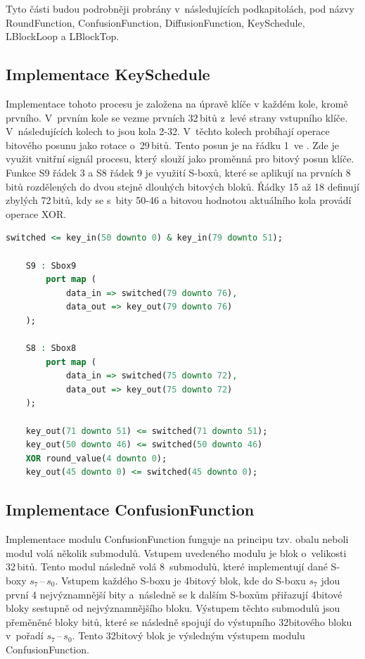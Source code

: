 \noindent Tyto části budou podrobněji probrány v~následujících podkapitolách, pod názvy RoundFunction, ConfusionFunction, DiffusionFunction, KeySchedule, LBlockLoop a LBlockTop.

\subsection{Implementace KeySchedule}
Implementace tohoto procesu je založena na úpravě klíče v každém kole, kromě prvního. V~prvním kole se vezme prvních 32\,bitů z~levé strany vstupního klíče. V~následujících kolech to jsou kola 2-32. V~těchto kolech probíhají operace bitového posunu jako rotace o~29\,bitů. Tento posun je na řádku 1~ve . Zde je využit vnitřní signál procesu, který slouží jako proměnná pro bitový posun klíče. Funkce S9 řádek 3 a S8 řádek 9 je využití S-boxů, které se aplikují na prvních 8\,bitů rozdělených do dvou stejně dlouhých bitových bloků. Řádky 15 až 18 definují zbylých 72\,bitů, kdy se s~bity 50-46 a bitovou hodnotou aktuálního kola provádí operace XOR.
\lstset{
numbers=left
}
\begin{lstlisting}[language=VHDL, caption=Key schedule, frame=single, label={vyp:keySchedule}]
switched <= key_in(50 downto 0) & key_in(79 downto 51);

    S9 : Sbox9 
        port map (
            data_in => switched(79 downto 76),
            data_out => key_out(79 downto 76)
    );
    
    S8 : Sbox8
        port map (
            data_in => switched(75 downto 72),
            data_out => key_out(75 downto 72)   
    );
    
    key_out(71 downto 51) <= switched(71 downto 51);
    key_out(50 downto 46) <= switched(50 downto 46) 
    XOR round_value(4 downto 0);
    key_out(45 downto 0) <= switched(45 downto 0);
\end{lstlisting}
\subsection{Implementace ConfusionFunction\label{subsec:confusion}}
Implementace modulu ConfusionFunction funguje na principu tzv. obalu neboli modul volá několik submodulů. Vstupem uvedeného modulu je blok o~velikosti 32\,bitů. Tento modul následně volá 8~submodulů, které implementují dané S-boxy $s_7$\,--\,$s_0$. Vstupem každého S-boxu je 4bitový blok, kde do S-boxu $s_7$ jdou první 4 nejvýznamnější bity a~následně se k dalším S-boxům přiřazují 4bitové bloky sestupně od nejvýznamnějšího bloku. Výstupem těchto submodulů jsou přeměněné bloky bitů, které se následně spojují do výstupního 32bitového bloku v~pořadí $s_7$\,--\,$s_0$. Tento 32bitový blok je výsledným výstupem modulu ConfusionFunction.

